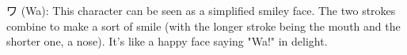 %
%

\hspace*{10mm}
\begin{minipage}{\dimexpr\textwidth-10mm\relax}
\end{minipage}

ワ (Wa): This character can be seen as a simplified smiley face. The two
strokes combine to make a sort of smile (with the longer stroke being the mouth
and the shorter one, a nose). It's like a happy face saying "Wa!" in delight.

